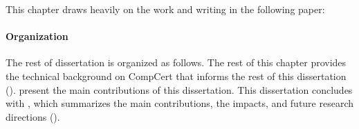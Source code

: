 This chapter draws heavily on the work and writing in the following paper:


\paragraph{Organization}

The rest of dissertation is organized as follows.  The rest of this chapter provides the technical
background on CompCert that informs the rest of this dissertation ().
 present the main contributions of this
dissertation.  This dissertation concludes with , which summarizes the main
contributions, the impacts, and future research directions ().





%


